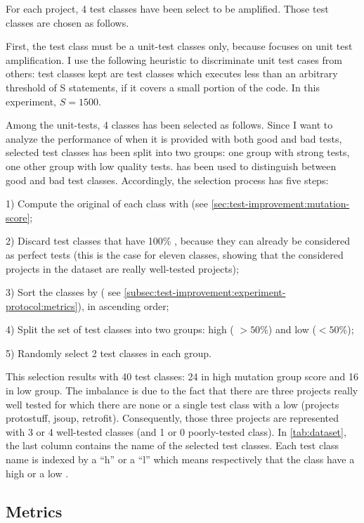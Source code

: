 For each project, 4 test classes have been select to be amplified. 
Those test classes are chosen as follows.

First, the test class must be a unit-test classes only, because \dspot focuses on unit test amplification. 
I use the following heuristic to discriminate unit test cases from others: 
test classes kept are test classes which executes less than an arbitrary threshold of S statements, \ie if it covers a small portion of the code.
In this experiment, $S=1500$.

Among the unit-tests, 4 classes has been selected as follows.
Since I want to analyze the performance of \dspot when it is provided with both good and bad tests, selected test classes has been split into two groups: 
one group with strong tests, one other group with low quality tests.
\ms has been used to distinguish between good and bad test classes.
Accordingly, the selection process has five steps:

1) Compute the original \ms of each class with \pitest (see \autoref{sec:test-improvement:mutation-score};

2) Discard test classes that have 100\% \ms, because they can already be considered as perfect tests 
(this is the case for eleven classes, showing that the considered projects in the dataset are really well-tested projects);

3) Sort the classes by \ms ( see \autoref{subsec:test-improvement:experiment-protocol:metrics}), in ascending order;

4) Split the set of test classes into two groups: high \ms( $> 50\%$) and low \ms  ($< 50\%$);

5) Randomly select 2 test classes in each group.

This selection results with 40 test classes: 24 in high mutation group score and 16 in low \ms group.
The imbalance is due to the fact that there are three projects really well tested for which there are none or a single test class with a low \ms (projects protostuff, jsoup, retrofit).
Consequently, those three projects are represented with 3 or 4 well-tested classes (and 1 or 0 poorly-tested class). 
In \autoref{tab:dataset}, the last column contains the name of the selected test classes. 
Each test class name is indexed by a ``h'' or a ``l'' which means respectively that the class have a high \ms or a low \ms.

\subsection{Metrics}
\label{subsec:test-improvement:experiment-protocol:metrics}

